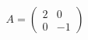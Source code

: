 \documentclass[preview]{standalone}
\begin{document}
\begin{align*}
A = \begin{pmatrix} 2 & 0 \\ 0 & -1 \end{pmatrix}
\end{align*}
\end{document}

